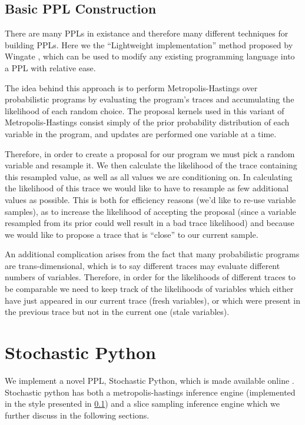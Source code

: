 \subsection{Basic PPL Construction}
\label{pplBack}
There are many PPLs in existance and therefore many different techniques for building PPLs. Here we the ``Lightweight implementation'' method proposed by Wingate \cite{wingate2011lightweight}, which can be used to modify any existing programming language into a PPL with relative ease.

The idea behind this approach is to perform Metropolis-Hastings over probabilistic programs by evaluating the program's traces and accumulating the likelihood of each random choice. The proposal kernels used in this variant of Metropolis-Hastings consist simply of the prior probability distribution of each variable in the program, and updates are performed one variable at a time.

Therefore, in order to create a proposal for our program we must pick a random variable and resample it. We then calculate the likelihood of the trace containing this resampled value, as well as all values we are conditioning on. In calculating the likelihood of this trace we would like to have to resample as few additional values as possible. This is both for efficiency reasons (we'd like to re-use variable samples), as to increase the likelihood of accepting the proposal (since a variable resampled from its prior could well result in a bad trace likelihood) and because we would like to propose a trace that is ``close'' to our current sample.

An additional complication arises from the fact that many probabilistic programs are trans-dimensional, which is to say different traces may evaluate different numbers of variables. Therefore, in order for the likelihoods of different traces to be comparable we need to keep track of the likelihoods of variables which either have just appeared in our current trace (fresh variables), or which were present in the previous trace but not in the current one (stale variables). 

\section{Stochastic Python}
\label{sect:StocPy}
We implement a novel PPL, Stochastic Python, which is made available online \cite{stocPy} . Stochastic python has both a metropolis-hastings inference engine (implemented in the style presented in \ref{pplBack}) and a slice sampling inference engine which we further discuss in the following sections.

